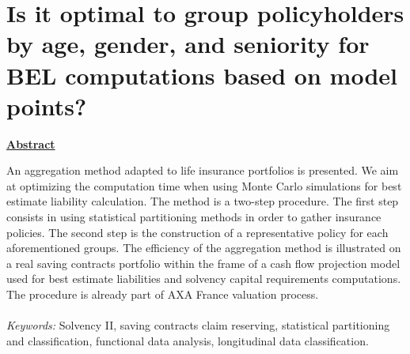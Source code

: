 
\chapter{Is it optimal to group policyholders by age, gender, and seniority for BEL computations based on model points?}\label{Chapter6}
	\minitoc
	\newpage




%
\begin{center}
\Large{\underline{\textbf{Abstract}}}\\
\end{center}
An aggregation method adapted to life insurance portfolios is presented. We aim at optimizing the computation time when using Monte Carlo simulations for best estimate liability calculation. The method is a two-step procedure. The first step consists in using statistical partitioning methods in order to gather insurance policies. The second step is the construction of a representative policy for each aforementioned groups. The efficiency of the aggregation method is illustrated on a real saving contracts portfolio within the frame of a cash flow projection model used for best estimate liabilities and solvency capital requirements computations. The procedure is already part of AXA France valuation process.\\
\\
\textit{Keywords:} Solvency II, saving contracts claim reserving, statistical partitioning and classification, functional data analysis, longitudinal data classification. 
